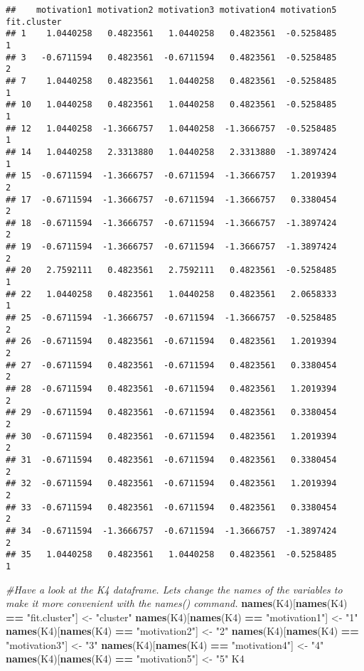 \documentclass[]{article}
\newenvironment{Shaded}{\begin{snugshade}}{\end{snugshade}}
\newcommand{\CommentTok}[1]{\textcolor[rgb]{0.56,0.35,0.01}{\textit{#1}}}
\newcommand{\KeywordTok}[1]{\textcolor[rgb]{0.13,0.29,0.53}{\textbf{#1}}}
\newcommand{\NormalTok}[1]{#1}
\newcommand{\OperatorTok}[1]{\textcolor[rgb]{0.81,0.36,0.00}{\textbf{#1}}}
\newcommand{\StringTok}[1]{\textcolor[rgb]{0.31,0.60,0.02}{#1}}
\begin{document}
\begin{verbatim}
##    motivation1 motivation2 motivation3 motivation4 motivation5 fit.cluster
## 1    1.0440258   0.4823561   1.0440258   0.4823561  -0.5258485           1
## 3   -0.6711594   0.4823561  -0.6711594   0.4823561  -0.5258485           2
## 7    1.0440258   0.4823561   1.0440258   0.4823561  -0.5258485           1
## 10   1.0440258   0.4823561   1.0440258   0.4823561  -0.5258485           1
## 12   1.0440258  -1.3666757   1.0440258  -1.3666757  -0.5258485           1
## 14   1.0440258   2.3313880   1.0440258   2.3313880  -1.3897424           1
## 15  -0.6711594  -1.3666757  -0.6711594  -1.3666757   1.2019394           2
## 17  -0.6711594  -1.3666757  -0.6711594  -1.3666757   0.3380454           2
## 18  -0.6711594  -1.3666757  -0.6711594  -1.3666757  -1.3897424           2
## 19  -0.6711594  -1.3666757  -0.6711594  -1.3666757  -1.3897424           2
## 20   2.7592111   0.4823561   2.7592111   0.4823561  -0.5258485           1
## 22   1.0440258   0.4823561   1.0440258   0.4823561   2.0658333           1
## 25  -0.6711594  -1.3666757  -0.6711594  -1.3666757  -0.5258485           2
## 26  -0.6711594   0.4823561  -0.6711594   0.4823561   1.2019394           2
## 27  -0.6711594   0.4823561  -0.6711594   0.4823561   0.3380454           2
## 28  -0.6711594   0.4823561  -0.6711594   0.4823561   1.2019394           2
## 29  -0.6711594   0.4823561  -0.6711594   0.4823561   0.3380454           2
## 30  -0.6711594   0.4823561  -0.6711594   0.4823561   1.2019394           2
## 31  -0.6711594   0.4823561  -0.6711594   0.4823561   0.3380454           2
## 32  -0.6711594   0.4823561  -0.6711594   0.4823561   1.2019394           2
## 33  -0.6711594   0.4823561  -0.6711594   0.4823561   0.3380454           2
## 34  -0.6711594  -1.3666757  -0.6711594  -1.3666757  -1.3897424           2
## 35   1.0440258   0.4823561   1.0440258   0.4823561  -0.5258485           1
\end{verbatim}

\begin{Shaded}
\begin{Highlighting}[]
\CommentTok{#Have a look at the K4 dataframe. Lets change the names of the variables to make it more convenient with the names() command.}
\KeywordTok{names}\NormalTok{(K4)[}\KeywordTok{names}\NormalTok{(K4) }\OperatorTok{==}\StringTok{ "fit.cluster"}\NormalTok{] <-}\StringTok{ "cluster"}
\KeywordTok{names}\NormalTok{(K4)[}\KeywordTok{names}\NormalTok{(K4) }\OperatorTok{==}\StringTok{ "motivation1"}\NormalTok{] <-}\StringTok{ "1"}
\KeywordTok{names}\NormalTok{(K4)[}\KeywordTok{names}\NormalTok{(K4) }\OperatorTok{==}\StringTok{ "motivation2"}\NormalTok{] <-}\StringTok{ "2"}
\KeywordTok{names}\NormalTok{(K4)[}\KeywordTok{names}\NormalTok{(K4) }\OperatorTok{==}\StringTok{ "motivation3"}\NormalTok{] <-}\StringTok{ "3"}
\KeywordTok{names}\NormalTok{(K4)[}\KeywordTok{names}\NormalTok{(K4) }\OperatorTok{==}\StringTok{ "motivation4"}\NormalTok{] <-}\StringTok{ "4"}
\KeywordTok{names}\NormalTok{(K4)[}\KeywordTok{names}\NormalTok{(K4) }\OperatorTok{==}\StringTok{ "motivation5"}\NormalTok{] <-}\StringTok{ "5"}
\NormalTok{K4}
\end{Highlighting}
\end{Shaded}
\end{document}
